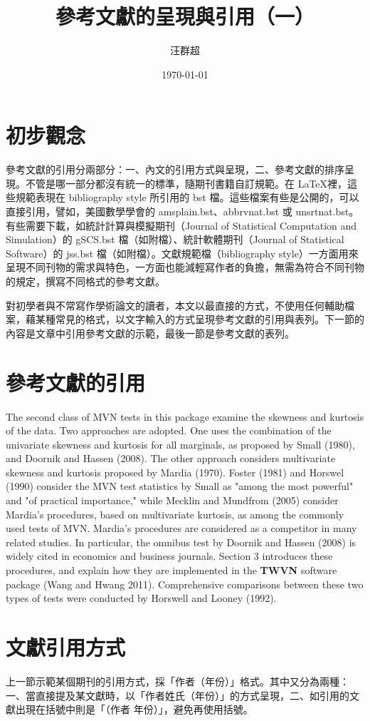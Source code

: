 \documentclass[12pt, a4paper]{article}
\title{ {\MB 參考文獻的呈現與引用（一）}}		%
\author{{\SM 汪群超}}						%
\date{{\TT \today }}
\begin{document}
\maketitle
\fontsize{12}{22pt}\selectfont 
\section{初步觀念}
參考文獻的引用分兩部分：一、內文的引用方式與呈現，二、參考文獻的排序呈現。不管是哪一部分都沒有統一的標準，隨期刊書籍自訂規範。在   \LaTeX 裡，這些規範表現在 bibliography style 所引用的 bst 檔。這些檔案有些是公開的，可以直接引用，譬如，美國數學學會的 amsplain.bst、abbrvnat.bst 或 unsrtnat.bst。有些需要下載，如統計計算與模擬期刊（Journal of Statistical Computation and Simulation）的 gSCS.bst 檔（如附檔）、統計軟體期刊（Journal of Statistical Software）的 jss.bst 檔（如附檔）。文獻規範檔（bibliography style）一方面用來呈現不同刊物的需求與特色，一方面也能減輕寫作者的負擔，無需為符合不同刊物的規定，撰寫不同格式的參考文獻。

對初學者與不常寫作學術論文的讀者，本文以最直接的方式，不使用任何輔助檔案，藉某種常見的格式，以文字輸入的方式呈現參考文獻的引用與表列。下一節的內容是文章中引用參考文獻的示範，最後一節是參考文獻的表列。

\section{參考文獻的引用}
The second class of MVN tests in this package examine the skewness and kurtosis of the data. Two approaches are adopted. One uses the combination of the univariate skewness and kurtosis for all marginals, as proposed by Small (1980), and Doornik and Hassen (2008). The other approach considers multivariate skewness and kurtosis proposed by Mardia (1970).   Foster (1981) and Horswel (1990) consider the MVN test statistics by Small as "among the most powerful" and "of practical importance,"  while  Mecklin and Mundfrom (2005) consider Mardia's procedures, based on multivariate kurtosis, as among the commonly used tests of MVN.  Mardia's procedures are considered as a competitor  in many related studies.
In particular, the omnibus test by  Doornik and Hassen (2008) is widely cited in economics and business journals. Section 3 introduces these procedures, and explain how they are implemented in the \textbf{TWVN} software package (Wang and Hwang 2011). Comprehensive  comparisons between these two types of tests were conducted by Horswell and Looney (1992).

\section{文獻引用方式}
上一節示範某個期刊的引用方式，採「作者（年份）」格式。其中又分為兩種：一、當直接提及某文獻時，以「作者姓氏（年份）」的方式呈現，二、如引用的文獻出現在括號中則是「（作者 年份）」，避免再使用括號。
\end{document}
